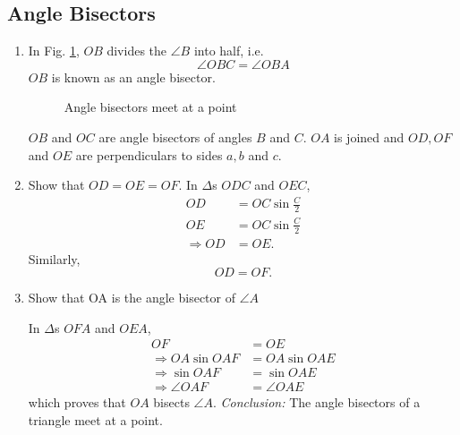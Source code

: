 \subsection{Angle Bisectors}
\renewcommand{\theequation}{\theenumi}
\begin{enumerate}[label=\arabic*.,ref=\thesubsection.\theenumi]
\item
	In Fig. \ref{ch3_angle_bisector}, $OB$ divides the  $\angle B$ into half, i.e.\begin{equation}
	\angle OBC = \angle OBA
	\end{equation}
	$OB$ is known as an angle bisector.


\begin{figure}[!ht]
	\begin{center}
		
		\resizebox{\columnwidth}{!}{}
	\end{center}
	\caption{Angle bisectors meet at a point}
	\label{ch3_angle_bisector}	
\end{figure}

	$OB$ and $OC$ are angle bisectors of angles $B$ and $C$. $OA$ is joined and $OD, OF$ and $OE$ are perpendiculars to sides $a,b$ and $c$.
\item
  Show that $OD = OE = OF$.
\solution In $\Delta$s $ODC$ and $OEC$,
\begin{align}
OD &= OC \sin \frac{C}{2}
\\
OE &= OC \sin \frac{C}{2} 
\\
\Rightarrow OD &=OE.
\end{align}
Similarly,
\begin{equation}
OD = OF.
\end{equation}
%
\item
	Show that OA is the angle bisector of $\angle A$

\solution In $\Delta$s $OFA$ and $OEA$,
\begin{align}
OF &= OE
\\
\Rightarrow OA \sin OAF &= OA \sin OAE \\
\Rightarrow \sin OAF &=  \sin OAE \\
\Rightarrow \angle OAF &= \angle OAE
\end{align}
which proves that $OA$ bisects $\angle A$.
{\em Conclusion:} The angle bisectors of a triangle meet at a point.

\end{enumerate}
